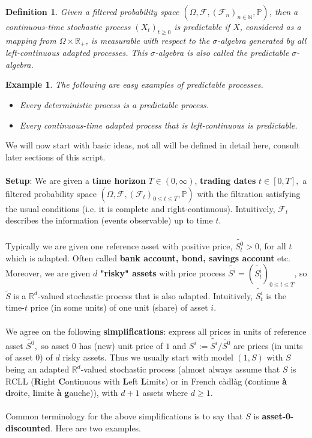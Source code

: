 \documentclass[12pt,a4paper, twoside]{article}
\newtheorem{defn}{Definition}[section]
\newtheorem{exmp}{Example}[section]
\theoremstyle{definition}
\begin{document}
\begin{defn} Given a filtered probability space $(\Omega, \mathcal{F}, ( \mathcal{F}_n)_{n \in \mathbb{N}}, \mathbb{P})$, then a continuous-time stochastic process $(X_t)_{t \geq 0}$ is predictable if $X$, considered as a mapping from $\Omega \times \mathbb{R}_+$, is measurable with respect to the $\sigma$-algebra generated by all left-continuous adapted processes. This $\sigma$-algebra is also called the predictable $\sigma$-algebra. 
\end{defn}
\begin{exmp} The following are easy examples of predictable processes.
\begin{itemize}
\item Every deterministic process is a predictable process.
\item Every continuous-time adapted process that is left-continuous is predictable.
\end{itemize}
\end{exmp}
We will now start with basic ideas, not all will be defined in detail here, consult later sections of this script. 
\\\\
\textbf{Setup}: We are given a \textbf{time horizon} $T \in (0, \infty)$, \textbf{trading dates} $t \in [0,T],$ a filtered probability space $( \Omega, \mathcal{F}, ( \mathcal{F}_t)_{0 \leq t \leq T}, \mathbb{P})$ with the filtration satisfying the usual conditions (i.e. it is complete and right-continuous). Intuitively, $\mathcal{F}_t$ describes the information (events observable) up to time $t.$ 
\\\\
Typically we are given one reference asset with positive price, $\widetilde{S_t^0}>0$, for all $t$ which is adapted. Often called \textbf{bank account, bond, savings account} etc. Moreover, we are given $d$ \textbf{"risky" assets} with price process $\widetilde{S^i}=(\widetilde{S_t^i})_{0 \leq t \leq T}$, so $\widetilde{S}$ is a $\mathbb{R}^d$-valued stochastic process that is also adapted. Intuitively, $\widetilde{S_t^i}$ is the time-$t$ price (in some units) of one unit (share) of asset $i$.
\\\\
We agree on the following \textbf{simplifications}: express all prices in units of reference asset $\widetilde{S^0},$ so asset $0$ has (new) unit price of $1$ and $S^i:= \widetilde{S^i}/\widetilde{S^0}$ are prices (in units of asset $0$) of $d$ risky assets. Thus we usually start with model $(1,S)$ with $S$ being an adapted $\mathbb{R}^d$-valued stochastic process (almost always assume that $S$ is RCLL (\textbf{R}ight \textbf{C}ontinuous with \textbf{L}eft \textbf{L}imits) or in French càdlàg (\textbf{c}ontinue \textbf{à} \textbf{d}roite, \textbf{l}imite \textbf{à} \textbf{g}auche)), with $d+1$ assets where $d \geq 1$. 
\\\\
Common terminology for the above simplifications is to say that $S$ is \textbf{asset-0-discounted}.
\newpage
Here are two examples.
\end{document}
